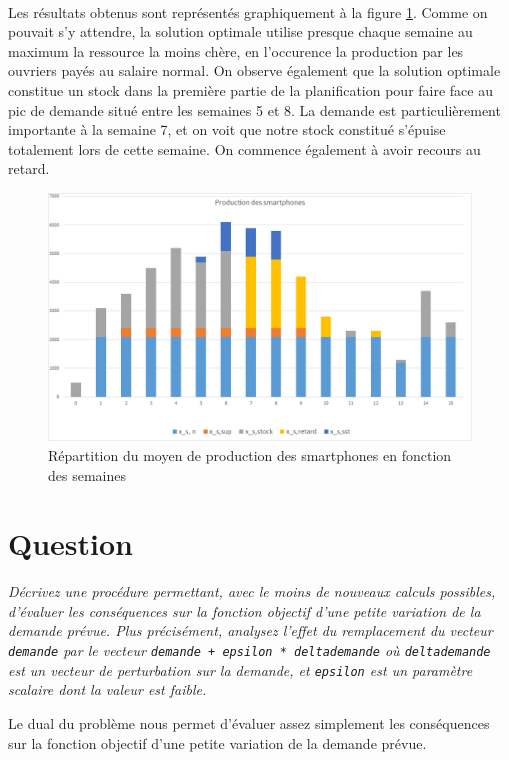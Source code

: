 \documentclass[12pt,oneside,a4paper]{article}
\newcommand{\question}
{
\addtocounter{section}{1}
\section*{Question \thesection}
}
\begin{document}
\paragraph{}
Les résultats obtenus sont représentés graphiquement à la figure \ref{fig:GraphProduction}. 
Comme on pouvait s'y attendre, la solution optimale utilise presque chaque semaine au maximum la ressource la moins chère, en l'occurence la production par les ouvriers payés au salaire normal.
On observe également que la solution optimale constitue un stock dans la première partie de la planification pour faire face au pic de demande situé entre les semaines 5 et 8.
La demande est particulièrement importante à la semaine 7, et on voit que notre stock constitué s'épuise totalement lors de cette semaine.
On commence également à avoir recours au retard.



\begin{figure}[H]
	\centering
		\includegraphics[scale = 0.8]{GraphProduction.png}
	\caption{Répartition du moyen de production des smartphones en fonction des semaines}
	\label{fig:GraphProduction}
\end{figure}

\question %
\emph{Décrivez une procédure permettant, avec le moins de nouveaux calculs
possibles, d'évaluer les conséquences sur la fonction objectif d’une petite
variation de la demande prévue. Plus précisément, analysez l'effet du
remplacement du vecteur \texttt{demande} 
par le vecteur \texttt{demande + epsilon * delta\textunderscore demande} 
où \texttt{delta\textunderscore demande} est un vecteur de perturbation 
sur la demande, 
et \texttt{epsilon} est un paramètre scalaire dont la valeur est faible.}

Le dual du problème nous permet d'évaluer assez simplement
les conséquences sur la fonction objectif
d'une petite variation de la demande prévue.
\end{document}
